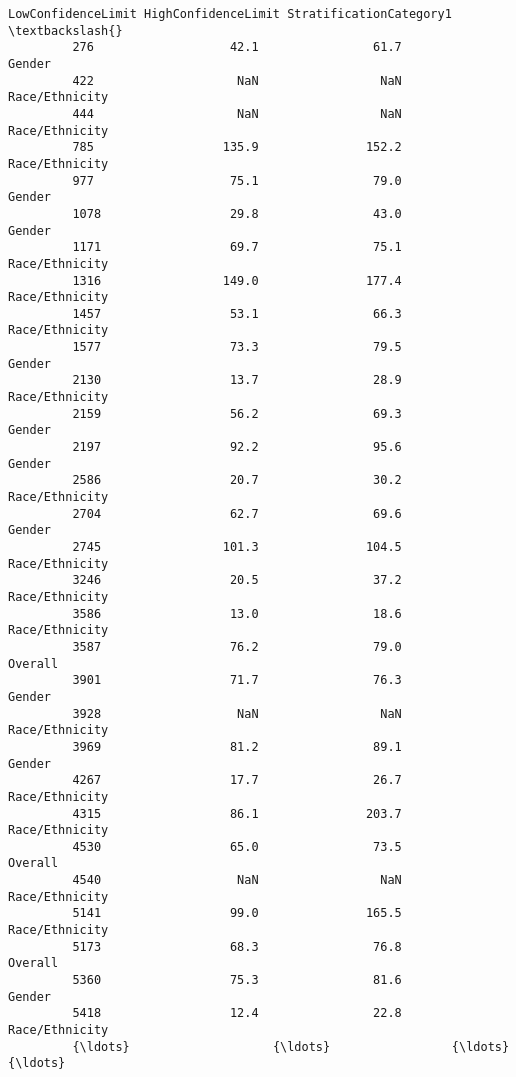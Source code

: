 \documentclass[11pt]{article}
\begin{document}
\begin{Verbatim}[commandchars=\\\{\}]
                 LowConfidenceLimit HighConfidenceLimit StratificationCategory1  \textbackslash{}
         276                   42.1                61.7                  Gender   
         422                    NaN                 NaN          Race/Ethnicity   
         444                    NaN                 NaN          Race/Ethnicity   
         785                  135.9               152.2          Race/Ethnicity   
         977                   75.1                79.0                  Gender   
         1078                  29.8                43.0                  Gender   
         1171                  69.7                75.1          Race/Ethnicity   
         1316                 149.0               177.4          Race/Ethnicity   
         1457                  53.1                66.3          Race/Ethnicity   
         1577                  73.3                79.5                  Gender   
         2130                  13.7                28.9          Race/Ethnicity   
         2159                  56.2                69.3                  Gender   
         2197                  92.2                95.6                  Gender   
         2586                  20.7                30.2          Race/Ethnicity   
         2704                  62.7                69.6                  Gender   
         2745                 101.3               104.5          Race/Ethnicity   
         3246                  20.5                37.2          Race/Ethnicity   
         3586                  13.0                18.6          Race/Ethnicity   
         3587                  76.2                79.0                 Overall   
         3901                  71.7                76.3                  Gender   
         3928                   NaN                 NaN          Race/Ethnicity   
         3969                  81.2                89.1                  Gender   
         4267                  17.7                26.7          Race/Ethnicity   
         4315                  86.1               203.7          Race/Ethnicity   
         4530                  65.0                73.5                 Overall   
         4540                   NaN                 NaN          Race/Ethnicity   
         5141                  99.0               165.5          Race/Ethnicity   
         5173                  68.3                76.8                 Overall   
         5360                  75.3                81.6                  Gender   
         5418                  12.4                22.8          Race/Ethnicity   
         {\ldots}                    {\ldots}                 {\ldots}                     {\ldots}   

\end{Verbatim}
\end{document}
